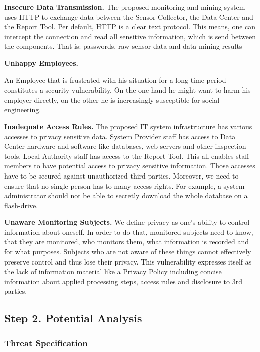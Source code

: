 \textbf{Insecure Data Transmission.}
The proposed monitoring and mining system uses HTTP to exchange data between the Sensor Collector, the Data Center and the Report Tool.
Per default, HTTP is a clear text protocol.
This means, one can intercept the connection and read all sensitive information, which is send between the components.
That is: passwords, raw sensor data and data mining results

\textbf{Unhappy Employees.}

An Employee that is frustrated with his situation for a long time
period constitutes a security vulnerability. On the one hand he might
want to harm his employer directly, on the other he is increasingly
susceptible for social engineering.

\textbf{Inadequate Access Rules.}
The proposed IT system infrastructure has various accesses to privacy sensitive data.
System Provider staff has access to Data Center hardware and software like databases, web-servers and other inspection tools.
Local Authority staff has access to the Report Tool.
This all enables staff members to have potential access to privacy sensitive information.
Those accesses have to be secured against unauthorized third parties.
Moreover, we need to ensure that no single person has to many access rights.
For example, a system administrator should not be able to secretly download the whole database on a flash-drive.


\textbf{Unaware Monitoring Subjects.}
We define privacy as one's ability to control information about
oneself.  In order to do that, monitored subjects need to know, that
they are monitored, who monitors them, what information is recorded
and for what purposes.  Subjects who are not aware of these things
cannot effectively preserve control and thus lose their privacy.  This
vulnerability expresses itself as the lack of information material
like a Privacy Policy including concise information about applied
processing steps, access rules and disclosure to 3rd parties.

\subsection{Step 2. Potential Analysis}

\subsubsection{Threat Specification}

